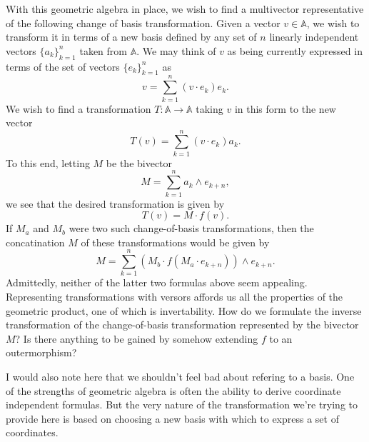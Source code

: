 \documentclass[12pt]{article}
\newcommand{\A}{\mathbb{A}}
\begin{document}
With this geometric algebra in place, we wish to find a multivector representative of the following
change of basis transformation.  Given a vector $v\in\A$, we wish to transform it in terms
of a new basis defined by any set of $n$ linearly independent vectors $\{a_k\}_{k=1}^n$ taken from $\A$.
We may think of $v$ as being currently expressed in terms of the set of vectors $\{e_k\}_{k=1}^n$ as
\begin{equation*}
v = \sum_{k=1}^n (v\cdot e_k)e_k.
\end{equation*}
We wish to find a transformation $T:\A\to\A$ taking $v$ in this form to the new vector
\begin{equation*}
T(v) = \sum_{k=1}^n (v\cdot e_k)a_k.
\end{equation*}
To this end, letting $M$ be the bivector
\begin{equation*}
M = \sum_{k=1}^n a_k\wedge e_{k+n},
\end{equation*}
we see that the desired transformation is given by
\begin{equation*}
T(v) = M\cdot f(v).
\end{equation*}
If $M_a$ and $M_b$ were two such change-of-basis transformations, then the concatination $M$
of these transformations would be given by
\begin{equation*}
M = \sum_{k=1}^n (M_b\cdot f(M_a\cdot e_{k+n}))\wedge e_{k+n}.
\end{equation*}
Admittedly, neither of the latter two formulas above seem appealing.  Representing transformations
with versors affords us all the properties of the geometric product, one of which is invertability.
How do we formulate the inverse transformation of the change-of-basis transformation represented
by the bivector $M$?  Is there anything to be gained by somehow extending $f$ to an outermorphism?

I would also note here that we shouldn't feel bad about refering to a basis.  One of the strengths of
geometric algebra is often the ability to derive coordinate independent formulas.  But the very nature
of the transformation we're trying to provide here is based on choosing a new basis with which
to express a set of coordinates.
\end{document}
